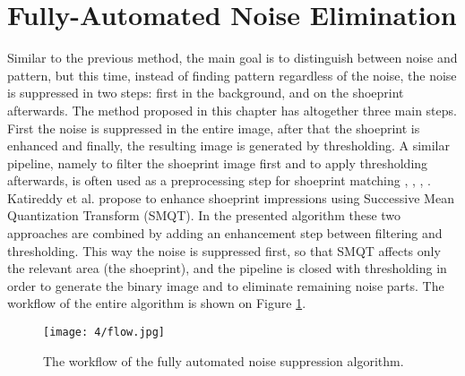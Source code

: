 \documentclass[draft,final]{vutinfth} %
\begin{document}
\section{Fully-Automated Noise Elimination}

\par
Similar to the previous method, the main goal is to distinguish between noise and pattern, but this time, instead of finding pattern regardless of the noise, the noise is suppressed in two steps: first in the background, and on the shoeprint afterwards.
The method proposed in this chapter has altogether three main steps. First the noise is suppressed in the entire image, after that the shoeprint is enhanced and finally, the resulting image is generated by thresholding.
A similar pipeline, namely to filter the shoeprint image first and to apply thresholding afterwards, is often used as a preprocessing step for shoeprint matching \cite{alizadeh2017automatic}, \cite{wang2014automatic}, \cite{li2014retrieval}, \cite{kong2014novel}.
Katireddy et al. \cite{katireddy2017novel} propose to enhance shoeprint impressions using Successive Mean Quantization Transform (SMQT).
In the presented algorithm these two approaches are combined by adding an enhancement step between filtering and thresholding.
This way the noise is suppressed first, so that SMQT affects only the relevant area (the shoeprint), and the pipeline is closed with thresholding in order to generate the binary image and to eliminate remaining noise parts.
The workflow of the entire algorithm is shown on Figure \ref{fig:fans:workflow}.

\begin{figure}[h]
  \centering
  \texttt{[image: 4/flow.jpg]}
  \caption{The workflow of the fully automated noise suppression algorithm.}
  \label{fig:fans:workflow} %
\end{figure}
\end{document}
